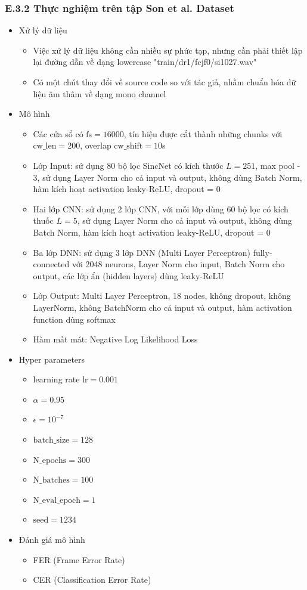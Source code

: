 \documentclass{article}
\begin{document}
	\subsubsection{E.3.2 Thực nghiệm trên tập Son et al. Dataset}
	\begin{itemize}
		\item Xử lý dữ liệu
		\begin{itemize}
			\item Việc xử lý dữ liệu không cần nhiều sự phức tạp, nhưng cần phải thiết lập lại đường dẫn về dạng lowercase "train/dr1/fcjf0/si1027.wav"
			\item Có một chút thay đổi về source code so với tác giả, nhầm chuẩn hóa dữ liệu âm thâm về dạng mono channel
		\end{itemize}
		\item Mô hình 
			\begin{itemize}
			\item Các cửa sổ có $\text{fs} = 16000$, tín hiệu được cắt thành những chunks với $\text{cw\_len}=200$, overlap $\text{cw\_shift}=10$s
			\item Lớp Input: sử dụng 80 bộ lọc SincNet có kích thước $L=251$, max pool - 3, sử dụng Layer Norm cho cả input và output, không dùng Batch Norm, hàm kích hoạt activation leaky-ReLU, dropout = 0
			\item Hai lớp CNN: sử dụng 2 lớp CNN, với mỗi lớp dùng 60 bộ lọc có kích thuốc $L=5$, sử dụng Layer Norm cho cả input và output, không dùng Batch Norm, hàm kích hoạt activation leaky-ReLU, dropout = 0
			\item Ba lớp DNN: sử dụng 3 lớp DNN (Multi Layer Perceptron) fully-connected với 2048 neurons, Layer Norm cho input, Batch Norm cho output, các lớp ẩn (hidden layers) dùng leaky-ReLU
			\item Lớp Output: Multi Layer Perceptron, 18 nodes, không dropout, không LayerNorm, không BatchNorm cho cả input và output, hàm activation function dùng softmax
			\item Hàm mất mát: Negative Log Likelihood Loss
		\end{itemize}
		\item Hyper parameters
		\begin{itemize}
			\item learning rate $\text{lr} = 0.001$
			\item $\alpha = 0.95$
			\item $\epsilon = 10^{-7}$
			\item $\text{batch\_size}=128$
			\item $\text{N\_epochs}=300$
			\item $\text{N\_batches}=100$
			\item $\text{N\_eval\_epoch}=1$
			\item $\text{seed}=1234$
		\end{itemize}
		\item Đánh giá mô hình
		\begin{itemize}
			\item FER (Frame Error Rate)
			\item CER (Classification Error Rate)
		\end{itemize}
	\end{itemize}
\end{document}
